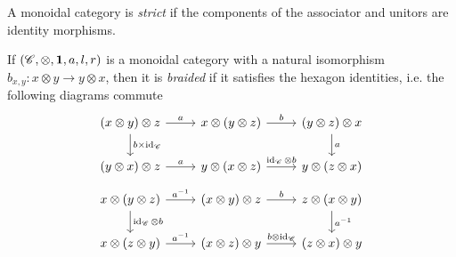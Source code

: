 A monoidal category is \emph{strict} if the components of the associator and unitors are identity morphisms.
\begin{definition} \label{braidedMonoidalCategory}
	If $(\mathscr{C},\otimes,\mathbf{1},a,l,r)$ is a monoidal category with a natural isomorphism $b_{x,y}:x\otimes y\to y\otimes x$, then it is \emph{braided} if it satisfies the hexagon identities, i.e. the following diagrams commute
	\[
\begin{tikzcd}
(x\otimes y)\otimes z \arrow[d, "b\times\id_\sC"] \arrow[r, "a"] & x\otimes(y\otimes z) \arrow[r, "b"]                & (y\otimes z)\otimes x \arrow[d, "a"] \\
(y\otimes x)\otimes z \arrow[r, "a"]                             & y\otimes(x\otimes z) \arrow[r, "\id_\sC\otimes b"] & y\otimes(z\otimes x)                
\end{tikzcd}
	\]
	\[\begin{tikzcd}
x\otimes(y\otimes z) \arrow[r, "a^{-1}"] \arrow[d, "\id_\sC\otimes b"] & (x\otimes y)\otimes z \arrow[r, "b"]               & z\otimes(x\otimes y) \arrow[d, "a^{-1}"] \\
x\otimes(z\otimes y) \arrow[r, "a^{-1}"]                               & (x\otimes z)\otimes y \arrow[r, "b\otimes\id_\sC"] & (z\otimes x)\otimes y                   
\end{tikzcd}\]
\end{definition}

